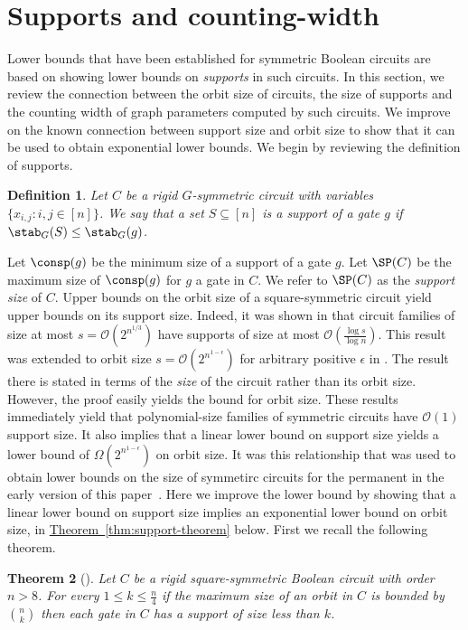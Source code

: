 \documentclass[11pt]{article}
\newcommand{\expref}[2]{\texorpdfstring{\hyperref[#2]{#1~\ref{#2}}}{#1~\ref{#2}}}
\newtheorem{theorem}{Theorem}[section]
\newtheorem{definition}[theorem]{Definition}
\begin{document}
\section{Supports and counting-width}\label{sec:supports}
Lower bounds that have been established for symmetric Boolean circuits are based on showing lower bounds on \emph{supports} in such circuits.  In this section, we review the connection between the orbit size of circuits, the size of supports and the counting width of graph parameters computed by such circuits.  We improve on the known connection between support size and orbit size to show that it can be used to obtain exponential lower bounds.  We begin by reviewing the definition of supports.
\begin{definition}
  Let $C$ be a rigid $G$-symmetric circuit with variables $\{x_{i, j}: i, j \in
  [n]\}$. We say that
  a set $S \subseteq [n]$ is a \emph{support} of a gate $g$ if
  $\stab_G(S) \leq \stab_G(g)$.
\end{definition}
Let $\consp(g)$ be the minimum size of a support of a gate $g$. Let $\SP(C)$ be
the maximum size of $\consp(g)$ for $g$ a gate in $C$.  We refer to $\SP(C)$ as the \emph{support size} of $C$.
Upper bounds on the orbit size of a square-symmetric circuit yield upper bounds on its support size.  Indeed, it was shown in \cite[Theorem~4]{AndersonD17} that circuit families of size at most $s = \mathcal{O}(2^{n^{1/3}})$ have supports of size at most $\mathcal{O}(\frac{\log s}{\log n})$.   This result was extended to orbit size $s = \mathcal{O}(2^{n^{1-\epsilon}})$ for arbitrary positive $\epsilon$ in \cite[Theorem~1]{AtseriasDO19}.  The result there is stated in terms of the
\emph{size} of the circuit rather than its orbit size.  However, the
proof easily yields the bound for orbit size.  These results
immediately yield that polynomial-size families of symmetric circuits
have $\mathcal{O}(1)$ support size.  It also implies that a linear
lower bound on support size yields a lower bound of
$\Omega(2^{n^{1-\epsilon}})$ on orbit size.  It was this relationship
that was used to obtain lower bounds on the size of symmetirc circuits
for the permanent in the early version of this paper~\cite{conf-version}.
Here we improve the lower bound by showing that a linear lower bound
on support size implies an exponential lower bound on orbit size, in
\expref{Theorem}{thm:support-theorem} below.  First we recall the
following theorem.
\begin{theorem}[{\cite[Theorem 4.10]{DawarW22}}]
  Let $C$ be a rigid square-symmetric Boolean circuit with order $n > 8$. For
  every $1 \leq k \leq \frac{n}{4}$ if the maximum size of an orbit in $C$ is
  bounded by $\binom{n}{k}$ then each gate in $C$ has a support of size less
  than $k$.
  \label{thm:support-theorem-general}
\end{theorem}
\end{document}
